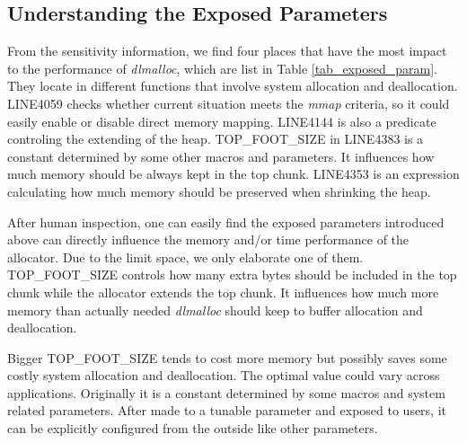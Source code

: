 \subsection{Understanding the Exposed Parameters}

\begin{table*}[htbp]
\centering
\caption{Exposed Parameters}
\label{tab_exposed_param}
\end{table*}
From the sensitivity information, we find four places that have the most impact to the performance of \emph{dlmalloc}, which are list in Table \ref{tab_exposed_param}. They locate in different functions that involve system allocation and deallocation. LINE4059 checks whether current situation meets the \emph{mmap} criteria, so it could easily enable or disable direct memory mapping. LINE4144 is also a predicate controling the extending of the heap. TOP\_FOOT\_SIZE in LINE4383 is a constant determined by some other macros and parameters. It influences how much memory should be always kept in the top chunk. LINE4353 is an expression calculating how much memory should be preserved when shrinking the heap.

After human inspection, one can easily find the exposed parameters introduced above can directly influence the memory and/or time performance of the allocator. Due to the limit space, we only elaborate one of them. TOP\_FOOT\_SIZE controls how many extra bytes should be included in the top chunk while the allocator extends the top chunk. It influences how much more memory than actually needed \emph{dlmalloc} should keep to buffer allocation and deallocation. 

Bigger TOP\_FOOT\_SIZE tends to cost more memory but possibly saves some costly system allocation and deallocation. The optimal value could vary across applications. Originally it is a constant determined by some macros and system related parameters. After made to a tunable parameter and exposed to users, it can be explicitly configured from the outside like other parameters.
